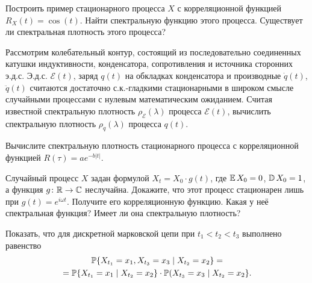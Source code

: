 \documentclass[12pt]{article}
\def\canon{\textbf{(каноническое задание)}}
\begin{document}
\begin{exercise}[subtitle={\canon}]
    Построить пример стационарного процесса $ X $ с корреляционной функцией $ R_X(t) = \cos(t) $.
    Найти спектральную функцию этого процесса.
    Существует ли спектральная плотность этого процесса?
\end{exercise}


\begin{exercise}[subtitle={\canon}]
    Рассмотрим колебательный контур,
    состоящий из последовательно соединенных катушки индуктивности,
    конденсатора, сопротивления и источника сторонних э.д.с.
    Э.д.с. $ \mathcal{E}(t) $, заряд $ q(t) $ на обкладках конденсатора и производные $ \dot q(t) $, $ \ddot q(t) $
    считаются достаточно с.к.-гладкими стационарными в широком смысле случайными процессами с нулевым математическим ожиданием.
    Считая известной спектральную плотность $ \rho_{\mathcal{E}}(\lambda) $ процесса $ \mathcal{E}(t) $,
    вычислить спектральную плотность $ \rho_q(\lambda) $ процесса $ q(t) $.
\end{exercise}


\begin{exercise}
    Вычислите спектральную плотность стационарного процесса с корреляционной функцией $ R(\tau) = a e^{-b|t|} $.
\end{exercise}


\begin{exercise}
    Случайный процесс $ X $ задан формулой $ X_t = X_0 \cdot g(t) $,
    где $ \operatorname{\mathbb{E}} X_0 = 0 $, $ \operatorname{\mathbb{D}} X_0 = 1 $, а функция $ g \colon \mathbb{R} \to \mathbb{C} $ неслучайна.
    Докажите, что этот процесс стационарен лишь при $ g(t) = e^{i \omega t} $.
    Получите его корреляционную функцию.
    Какая у неё спектральная функция?
    Имеет ли она спектральную плотность?
\end{exercise}

\newpage





\begin{exercise}[subtitle={\canon}]
    Показать, что для дискретной марковской цепи при $ t_1 < t_2 < t_3 $ выполнено равенство
    \begin{multline*}
        \mathbb{P} \{X_{t_1} = x_1, X_{t_3} = x_3 \mid X_{t_2} = x_2\} = \\ =
        \mathbb{P} \{X_{t_1} = x_1 \mid X_{t_2} = x_2\} \cdot \mathbb{P} (X_{t_3} = x_3 \mid X_{t_2} = x_2 \}.
    \end{multline*}
\end{exercise}
\end{document}
